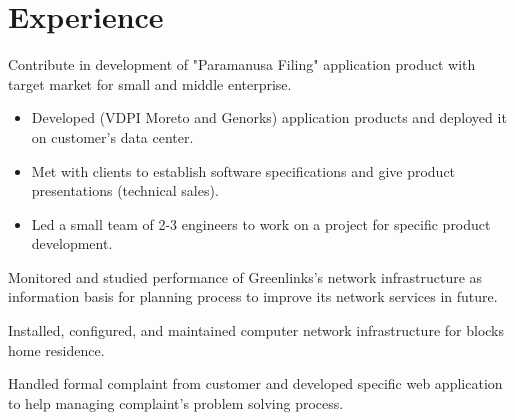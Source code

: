 \documentclass[10pt, a4paper]{moderncv}
\begin{document}
\section{Experience}
{
    \begin{scriptsize}
        Contribute in development of "Paramanusa Filing" application product with target market for small and middle enterprise.
    \end{scriptsize}
}
{
    \begin{itemize}
        \item Developed (VDPI Moreto and Genorks) application products and deployed it on customer's data center.
        \item Met with clients to establish software specifications and give product presentations (technical sales).
        \item Led a small team of 2-3 engineers to work on a project for specific product development.
    \end{itemize}
}
{
    \begin{scriptsize}
        Monitored and studied performance of Greenlinks's network infrastructure as information basis for planning process to improve its network services in future.
    \end{scriptsize}
}
{
    \begin{scriptsize}
        Installed, configured, and maintained computer network infrastructure for blocks home residence.
    \end{scriptsize}
}
{
    \begin{scriptsize}
        Handled formal complaint from customer and developed specific web application to help managing complaint's problem solving process.
    \end{scriptsize}
}
\end{document}
